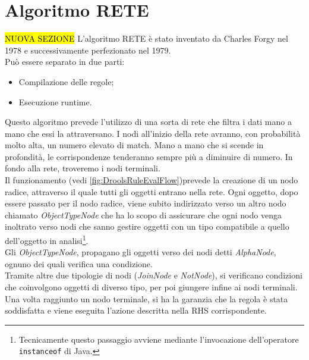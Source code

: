 \section{Algoritmo RETE}
\hl{NUOVA SEZIONE}
 \label{App:AppendiceAlgoritmoRete}
 	L'algoritmo RETE è stato inventato da Charles Forgy nel 1978 e successivamente perfezionato nel 1979. \\
 	Può essere separato in due parti:
 	\begin{itemize}
 		\item Compilazione delle regole;
 		\item Esecuzione runtime.
 	\end{itemize}
 	Questo algoritmo prevede l'utilizzo di una sorta di rete che filtra i dati mano a mano che essi la attraversano. I nodi all'inizio della rete avranno, con probabilità molto alta, un numero elevato di match. 
 	Mano a mano che si scende in profondità, le corrispondenze tenderanno sempre più a diminuire di numero. In fondo alla rete, troveremo i nodi terminali. \\
 	Il funzionamento (vedi  \autoref{fig:DroolsRuleEvalFlow})prevede la creazione di un nodo radice, attraverso il quale tutti gli oggetti entrano nella rete. Ogni oggetto, dopo essere passato per il nodo radice, viene subito indirizzato verso un altro nodo chiamato \textit{ObjectTypeNode} che ha lo scopo di assicurare che ogni nodo venga inoltrato verso nodi che sanno gestire oggetti con un tipo compatibile a quello dell'oggetto in analisi\footnote{Tecnicamente questo passaggio avviene mediante l'invocazione dell'operatore \texttt{instanceof} di Java.}.\\
 	Gli \textit{ObjectTypeNode},  propagano gli oggetti verso dei nodi detti \textit{AlphaNode}, ognuno dei quali verifica una condizione. \\
 	Tramite altre due tipologie di nodi (\textit{JoinNode} e \textit{NotNode}), si verificano condizioni che coinvolgono oggetti di diverso tipo, per poi giungere infine ai nodi terminali. \\
 	Una volta raggiunto un nodo terminale, si ha la garanzia che la regola è stata soddisfatta e viene eseguita l'azione descritta nella RHS corrispondente.
 	
